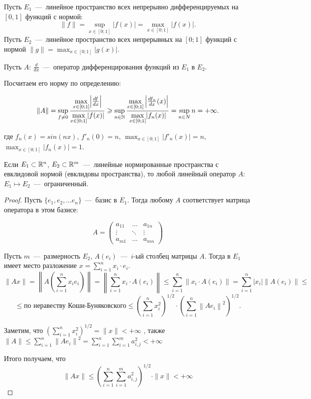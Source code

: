 \begin{example}
    Пусть $E_1$~---~линейное пространство всех непрерывно дифференцируемых на $[0, 1]$ функций с нормой: 
    \[\|f \| = \sup_{x \in [0; 1]}{|f(x)|} = \max_{x \in [0; 1]}{|f(x)|}.\] 
    Пусть $E_2$~---~линейное пространство всех непрерывных на $[0; 1]$ функций с нормой $\|g\| = \max_{x \in [0; 1]}{|g(x)|}$.

    Пусть $A$: $\frac{d}{dx}$~---~оператор дифференцирования функций из $E_1$ в $E_2$.
    
    Посчитаем его норму по определению:

    \[\displaystyle \| A \| = \sup_{f \neq 0}{\frac{\underset{x \in [0; 1]}{\max}{\left|\frac{df}{dx}\right|}}{\underset{x \in [0; 1]}{\max}{|f(x)|}}} \geqslant \sup_{n \in \mathbb{N}}{\frac{\underset{x \in [0; 1]}{\max}\left|{\frac{df_n}{dx}(x)}\right|}{\underset{x \in [0; 1]}{\max}{|f_n(x)|}}} = \sup_{n \in N} n = +\infty.\]

    где $f_n(x) = sin(nx)$, $f'_n(0) = n$, $\max_{x \in [0; 1]}{|f'_n(x)|} = n$, $\max_{x \in [0; 1]}{|f_n(x)|} = 1$.
\end{example}

\begin{theorem}
    Если $E_1 \subset \mathbb{R}^n$, $E_2 \subset \mathbb{R}^m$~---~линейные нормированные пространства с евклидовой нормой (евклидовы пространства), то любой линейный оператор $A$: $E_1 \mapsto E_2$~---~ограниченный.
\end{theorem}

\begin{proof}
    Пусть $\{ e_1, e_2, \dots e_n \}$~---~базис в $E_1$. Тогда любому $A$ соответствует матрица оператора в этом базисе:

    $$ A = \begin{pmatrix}
  a_{11}& \ldots & a_{1n}\\
  \vdots & \ddots & \vdots \\
  a_{m1}& \ldots & a_{mn}
\end{pmatrix}$$

    Пусть $m$~---~размерность $E_2$, $A(e_i)$~---~$i$-ый столбец матрицы $A$. Тогда в $E_1$ имеет место разложение $x = \sum_{i = 1}^n x_i \cdot e_i$.
    $$\| A x \| = \left\| A \left( \sum_{i = 1}^{n} x_{i} e_{i}\right)\right\| = \left\| \sum_{i = 1}^n x_i \cdot A(e_i) \right\| \leq \sum_{i = 1}^n \| x_i \cdot A(e_i) \| = \sum_{i = 1}^n |x_i| \|A(e_i)\| \leq$$
    $$\leq \text{по неравеству Коши-Буняковского} \leq \left (\sum_{i = 1}^n {x_i^2} \right)^{1/2} \cdot \left(\sum_{i = 1}^n {\left\|A e_i\right\|}^2 \right)^{1/2}.$$

     Заметим, что $\left(\sum_{i = 1}^n {x_i^2} \right)^{1/2} = \| x \| < + \infty$ , также $\|A\| \leq \sum_{i = 1}^n {\|A e_i\|}^2 =\sum_{i = 1}^n \sum_{i = 1}^m a_{i, j}^2 < + \infty $

     Итого получаем, что 
     \[ \|Ax\| \leq \left(\sum_{i = 1}^n \sum_{i = 1}^m a_{i, j}^2\right)^{1/2} \cdot \|x\| < +\infty \]
\end{proof}

